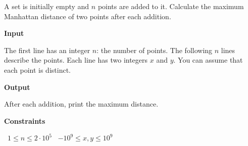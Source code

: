 A set is initially empty and $n$ points are added to it. Calculate the maximum Manhattan distance of two points after each addition.

\vspace{0.3cm}\noindent\textbf{Input}

The first line has an integer $n$: the number of points.
The following $n$ lines describe the points. Each line has two integers $x$ and $y$. You can assume that each point is distinct.

\vspace{0.3cm}\noindent\textbf{Output}

After each addition, print the maximum distance.

\vspace{0.3cm}\noindent\textbf{Constraints}

\textbullet\ $1 \le n \le 2 \cdot 10^5$
\textbullet\ $-10^9 \le x, y \le 10^9$